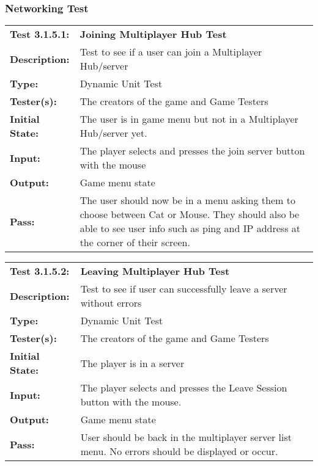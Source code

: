 \documentclass[12pt, titlepage]{article}
\begin{document}
\newpage
\subsubsection{Networking Test}
\begin{mdframed}[linewidth=1pt]
\begin{tabularx}{\textwidth}{@{}p{3cm}X@{}}
{\bf Test 3.1.5.1:} & {\bf Joining Multiplayer Hub Test}\\[\baselineskip]
{\bf Description:} & Test to see if a user can join a Multiplayer Hub/server\\[0.5\baselineskip]
{\bf Type:} & Dynamic Unit Test\\[0.5\baselineskip]
{\bf Tester(s):} & The creators of the game and Game Testers\\[0.5\baselineskip]
{\bf Initial State:} & The user is in game menu but not in a Multiplayer Hub/server yet. \\[0.5\baselineskip]
{\bf Input:} & The player selects and presses the join server button with the mouse \\[0.5\baselineskip]
{\bf Output:} & Game menu state\\[0.5\baselineskip]
{\bf Pass:} & The user should now be in a menu asking them to choose between Cat or Mouse. They should also be able to see user info such as ping and IP address at the corner of their screen.
\end{tabularx}
\end{mdframed}

\begin{mdframed}[linewidth=1pt]
\begin{tabularx}{\textwidth}{@{}p{3cm}X@{}}
{\bf Test 3.1.5.2:} & {\bf Leaving Multiplayer Hub Test}\\[\baselineskip]
{\bf Description:} & Test to see if user can successfully leave a server without errors\\[0.5\baselineskip]
{\bf Type:} & Dynamic Unit Test\\[0.5\baselineskip]
{\bf Tester(s):} & The creators of the game and Game Testers\\[0.5\baselineskip]
{\bf Initial State:} & The player is in a server\\[0.5\baselineskip]
{\bf Input:} & The player selects and presses the Leave Session button with the mouse. \\[0.5\baselineskip]
{\bf Output:} & Game menu state\\[0.5\baselineskip]
{\bf Pass:} & User should be back in the multiplayer server list menu. No errors should be displayed or occur.
\end{tabularx}
\end{mdframed}
\end{document}

